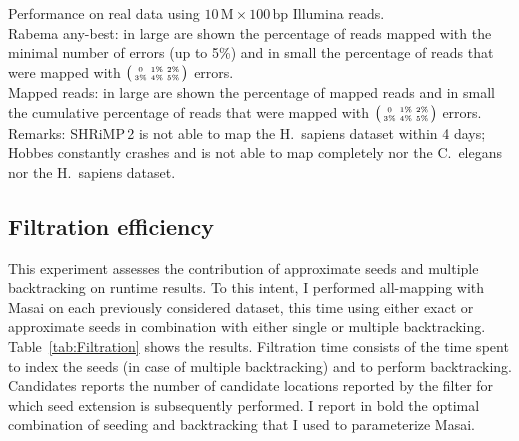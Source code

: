 \begin{table*}[t]
  \caption[Masai performance on real data]{
    \label{tab:Runtime}
    Performance on real data using $10\,\text{M}\times 100\,\text{bp}$ Illumina reads.\\
	Rabema any-best: in large are shown the percentage of reads mapped with the minimal number of errors (up to 5\%) and in small the percentage of reads that were mapped with $\bigl(\begin{smallmatrix}\mbox{\tiny 0}&\mbox{\tiny 1\%}&\mbox{\tiny 2\%}\\\mbox{\tiny 3\%}&\mbox{\tiny 4\%}&\mbox{\tiny 5\%}\end{smallmatrix}\bigr)$ errors.\\
	Mapped reads: in large are shown the percentage of mapped reads and in small the cumulative percentage of reads that were mapped with $\bigl(\begin{smallmatrix}\mbox{\tiny 0}&\mbox{\tiny 1\%}&\mbox{\tiny 2\%}\\\mbox{\tiny 3\%}&\mbox{\tiny 4\%}&\mbox{\tiny 5\%}\end{smallmatrix}\bigr)$ errors.\\
	Remarks:
    SHRiMP\,2 is not able to map the H.~sapiens dataset within 4 days;
    Hobbes constantly crashes and is not able to map completely nor the C.~elegans nor the H.~sapiens dataset.
  }
	\vspace{-3mm}
	\center
	\sffamily
	\resizebox{1.0\textwidth}{!}
	{
		\renewcommand{\tabcolsep}{0.8ex}
		
	}
\end{table*}


\subsection{Filtration efficiency}
\label{masai:evaluation:filter}

This experiment assesses the contribution of approximate seeds and multiple backtracking on runtime results.
To this intent, I performed all-mapping with Masai on each previously considered dataset, this time using either exact or approximate seeds in combination with either single or multiple backtracking.
Table~\ref{tab:Filtration} shows the results.
Filtration time consists of the time spent to index the seeds (in case of multiple backtracking) and to perform backtracking.
Candidates reports the number of candidate locations reported by the filter for which seed extension is subsequently performed.
I report in bold the optimal combination of seeding and backtracking that I used to parameterize Masai.

